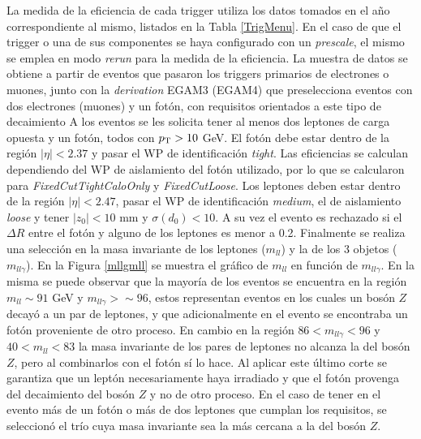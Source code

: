 La medida de la eficiencia de cada trigger utiliza los datos tomados en el año correspondiente al mismo, listados en la Tabla \ref{TrigMenu}. En el caso de que el trigger o una de sus componentes se haya configurado con un \textit{prescale}, el mismo se emplea en modo \textit{rerun} para la medida de la eficiencia. La muestra de datos se obtiene a partir de eventos que pasaron los triggers primarios de electrones o muones, junto con la \textit{derivation} EGAM3 (EGAM4) que preselecciona eventos con dos electrones (muones) y un fotón, con requisitos orientados a este tipo de decaimiento 
A los eventos se les solicita tener al menos dos leptones de carga opuesta y un fotón, todos con $p_{\text{T}}>10$ GeV. El fotón debe estar dentro de la región $|\eta| < 2.37$ y pasar el WP de identificación \textit{tight}. Las eficiencias se calculan dependiendo del WP de aislamiento del fotón utilizado, por lo que se calcularon para \textit{FixedCutTightCaloOnly} y \textit{FixedCutLoose}. Los leptones deben estar dentro de la región $|\eta| < 2.47$, pasar el WP de identificación \textit{medium}, el de aislamiento \textit{loose} y tener $|z_0| < 10$ mm y $\sigma(d_0) < 10$. A su vez el evento es rechazado si el $\Delta R$ entre el fotón y alguno de los leptones es menor a 0.2. Finalmente se realiza una selección en la masa invariante de los leptones ($m_{ll}$) y la de los 3 objetos ($m_{ll\gamma}$). En la Figura \ref{mllgmll} se muestra el gráfico de $m_{ll}$ en función de $m_{ll\gamma}$. En la misma se puede observar que la mayoría de los eventos se encuentra en la región $m_{ll}\sim91$ GeV y $m_{ll\gamma}>\sim96$, estos representan eventos en los cuales un bosón $Z$ decayó a un par de leptones, y que adicionalmente en el evento se encontraba un fotón proveniente de otro proceso. En cambio en la región $86<m_{ll\gamma}<96$ y $40<m_{ll}<83$ la masa invariante de los pares de leptones no alcanza la del bosón $Z$, pero al combinarlos con el fotón sí lo hace. Al aplicar este último corte se garantiza que un leptón necesariamente haya irradiado y que el fotón provenga del decaimiento del bosón $Z$ y no de otro proceso. En el caso de tener en el evento más de un fotón o más de dos leptones que cumplan los requisitos, se seleccionó el trío cuya masa invariante sea la más cercana a la del bosón $Z$.

